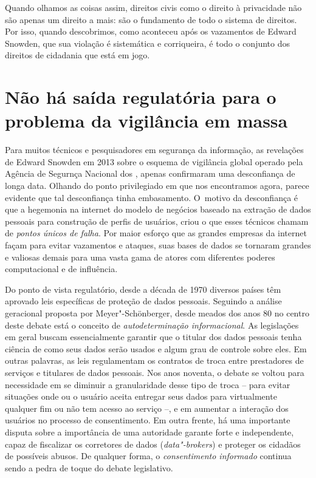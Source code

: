 Quando olhamos as coisas assim, direitos civis como o direito à
privacidade não são apenas um direito a mais: são o fundamento de todo o
sistema de direitos. Por isso, quando descobrimos, como aconteceu após
os vazamentos de Edward Snowden, que sua violação é sistemática e
corriqueira, é todo o conjunto dos direitos de cidadania que está em
jogo.

\section{Não há saída regulatória para o problema da vigilância em massa}

Para muitos técnicos e pesquisadores em segurança da informação, as
revelações de Edward Snowden em 2013 sobre o esquema de vigilância
global operado pela Agência de Segurnça Nacional dos , apenas
confirmaram uma desconfiança de longa data. Olhando do ponto
privilegiado em que nos encontramos agora, parece evidente que tal
desconfiança tinha embasamento. O~motivo da desconfiança é que a
hegemonia na internet do modelo de negócios baseado na extração de dados
pessoais para construção de perfis de usuários, criou o que esses
técnicos chamam de \emph{pontos únicos de falha}. Por maior esforço que
as grandes empresas da internet façam para evitar vazamentos e ataques,
suas bases de dados se tornaram grandes e valiosas demais para uma vasta
gama de atores com diferentes poderes computacional e de influência.

Do ponto de vista regulatório, desde a década de 1970 diversos países
têm aprovado leis específicas de proteção de dados pessoais. Seguindo a
análise geracional proposta por Meyer"-Schönberger, desde meados dos anos
80 no centro deste debate está o conceito de \emph{autodeterminação
informacional}. As legislações em geral buscam essencialmente garantir
que o titular dos dados pessoais tenha ciência de como seus dados serão
usados e algum grau de controle sobre eles. Em outras palavras, as leis
regulamentam os contratos de troca entre prestadores de serviços e
titulares de dados pessoais. Nos anos noventa, o debate se voltou para
necessidade em se diminuir a granularidade desse tipo de troca -- para
evitar situações onde ou o usuário aceita entregar seus dados para
virtualmente qualquer fim ou não tem acesso ao serviço --, e em aumentar
a interação dos usuários no processo de consentimento. Em outra frente,
há uma importante disputa sobre a importância de uma autoridade garante
forte e independente, capaz de fiscalizar os corretores de dados
(\emph{data"-brokers}) e proteger os cidadãos de possíveis abusos. De
qualquer forma, o \emph{consentimento informado} continua sendo a pedra
de toque do debate legislativo.


